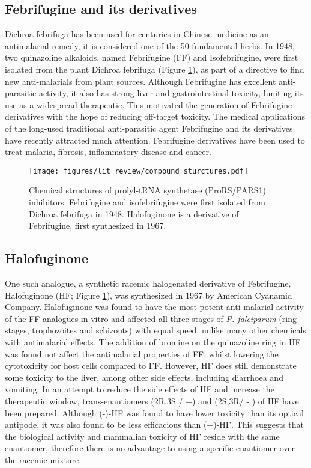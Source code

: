 \subsection{Febrifugine and its derivatives}\label{subsec:ff}
Dichroa febrifuga has been used for centuries in Chinese medicine as an antimalarial remedy, it is considered one of the 50 fundamental herbs.
In 1948, two quinazoline alkaloids, named Febrifugine (FF) and Isofebrifugine, were first isolated from the plant Dichroa febrifuga (Figure \ref{fig:FF_IF_HF})\cite{koepfli1949alkaloids}, as part of a directive to find new anti-malarials from plant sources.
Although Febrifugine has excellent anti-parasitic activity, it also has strong liver and gastrointestinal toxicity, limiting its use as a widespread therapeutic.
This motivated the generation of Febrifugine derivatives with the hope of reducing off-target toxicity.
The medical applications of the long-used traditional anti-parasitic agent Febrifugine and its derivatives have recently attracted much attention.
Febrifugine derivatives have been used to treat malaria, fibrosis, inflammatory disease and cancer.

\begin{figure}[htb]
\centering
\texttt{[image: figures/lit\_review/compound\_sturctures.pdf]}
\caption[Prolyl-tRNA synthetase inhibitor chemical structures]{Chemical structures of prolyl-tRNA synthetase (ProRS/PARS1) inhibitors.
Febrifugine and isofebrifugine were first isolated from Dichroa febrifuga in 1948.
Halofuginone is a derivative of Febrifugine, first synthesized in 1967.
}
\label{fig:FF_IF_HF}\end{figure}

\subsection{Halofuginone}
One such analogue, a synthetic racemic halogenated derivative of Febrifugine, Halofuginone (HF; Figure \ref{fig:FF_IF_HF}), was synthesized in 1967 by American Cyanamid Company\cite{zhang2017novel}.
Halofuginone was found to have the most potent anti-malarial activity of the FF analogues in vitro and affected all three stages of \textit{P. falciparum} (ring stages, trophozoites and schizonts) with equal speed, unlike many other chemicals with antimalarial effects.
The addition of bromine on the quinazoline ring in HF was found not affect the antimalarial properties of FF, whilst lowering the cytotoxicity for host cells compared to FF.
However, HF does still demonstrate some toxicity to the liver, among other side effects, including diarrhoea and vomiting\cite{pines2015halofuginone}.
In an attempt to reduce the side effects of HF and increase the therapeutic window, trans-enantiomers (2R,3S / +)  and (2S,3R/ - ) of HF have been prepared.
Although (-)-HF was found to have lower toxicity than its optical antipode, it was also found to be less efficacious than (+)-HF\cite{mordechay2021differential, linder20072r}.
This suggests that the biological activity and mammalian toxicity of HF reside with the same enantiomer, therefore there is no advantage to using a specific enantiomer over the racemic mixture.

